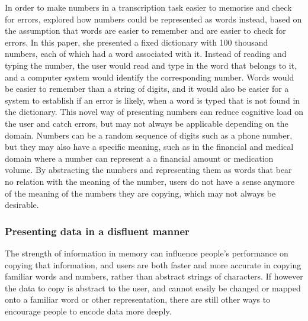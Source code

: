 \documentclass[11pt,oneside]{report}
\begin{document}
In order to make numbers in a transcription task easier to memorise and check for errors, \citet{Sandnes2013} explored how numbers could be represented as words instead, based on the assumption that words are easier to remember and are easier to check for errors. 
In this paper, she presented a fixed dictionary with 100 thousand numbers, each of which had a word associated with it. 
Instead of reading and typing the number, the user would read and type in the word that belongs to it, and a computer system would identify the corresponding number. 
Words would be easier to remember than a string of digits, and it would also be easier for a system to establish if an error is likely, when a word is typed that is not found in the dictionary. This novel way of presenting numbers can reduce cognitive load on the user and catch errors, but may not always be applicable depending on the domain. Numbers can be a random sequence of digits such as a phone number, but they may also have a specific meaning, such as in the financial and medical domain where a number can represent a a financial amount or medication volume.
By abstracting the numbers and representing them as words that bear no relation with the meaning of the number, users do not have a sense anymore of the meaning of the numbers they are copying, which may not always be desirable.

\subsubsection{Presenting data in a disfluent manner}
The strength of information in memory can influence people's performance on copying that information, and users are both faster and more accurate in copying familiar words and numbers, rather than abstract strings of characters. If however the data to copy is abstract to the user, and cannot easily be changed or mapped onto a familiar word or other representation, there are still other ways to encourage people to encode data more deeply. 
\end{document}
